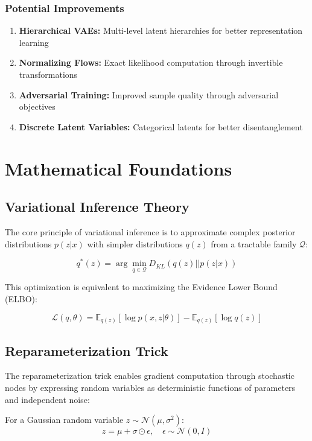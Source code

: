\documentclass{article}
\begin{document}
\subsubsection{Potential Improvements}
\begin{enumerate}
\item \textbf{Hierarchical VAEs:} Multi-level latent hierarchies for better representation learning
\item \textbf{Normalizing Flows:} Exact likelihood computation through invertible transformations
\item \textbf{Adversarial Training:} Improved sample quality through adversarial objectives
\item \textbf{Discrete Latent Variables:} Categorical latents for better disentanglement
\end{enumerate}

\section{Mathematical Foundations}

\subsection{Variational Inference Theory}

The core principle of variational inference is to approximate complex posterior distributions $p(z|x)$ with simpler distributions $q(z)$ from a tractable family $\mathcal{Q}$:

\[
q^*(z) = \arg\min_{q \in \mathcal{Q}} D_{KL}(q(z)||p(z|x))
\]

This optimization is equivalent to maximizing the Evidence Lower Bound (ELBO):

\[
\mathcal{L}(q, \theta) = \mathbb{E}_{q(z)}[\log p(x,z|\theta)] - \mathbb{E}_{q(z)}[\log q(z)]
\]

\subsection{Reparameterization Trick}

The reparameterization trick enables gradient computation through stochastic nodes by expressing random variables as deterministic functions of parameters and independent noise:

For a Gaussian random variable $z \sim \mathcal{N}(\mu, \sigma^2)$:
\[
z = \mu + \sigma \odot \epsilon, \quad \epsilon \sim \mathcal{N}(0, I)
\]
\end{document}
